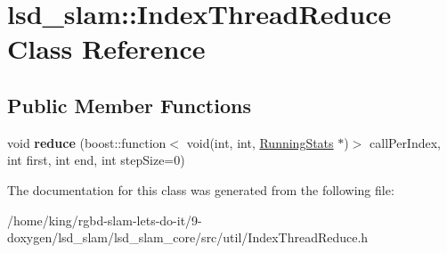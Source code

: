 \hypertarget{classlsd__slam_1_1_index_thread_reduce}{\section{lsd\-\_\-slam\-:\-:Index\-Thread\-Reduce Class Reference}
\label{classlsd__slam_1_1_index_thread_reduce}
}
\subsection*{Public Member Functions}
\begin{DoxyCompactItemize}
\item 
\hypertarget{classlsd__slam_1_1_index_thread_reduce_ab2476f8c783eed60926b7e161cf2e0fb}{void {\bfseries reduce} (boost\-::function$<$ void(int, int, \hyperlink{classlsd__slam_1_1_running_stats}{Running\-Stats} $\ast$)$>$ call\-Per\-Index, int first, int end, int step\-Size=0)}\label{classlsd__slam_1_1_index_thread_reduce_ab2476f8c783eed60926b7e161cf2e0fb}

\end{DoxyCompactItemize}


The documentation for this class was generated from the following file\-:\begin{DoxyCompactItemize}
\item 
/home/king/rgbd-\/slam-\/lets-\/do-\/it/9-\/doxygen/lsd\-\_\-slam/lsd\-\_\-slam\-\_\-core/src/util/Index\-Thread\-Reduce.\-h\end{DoxyCompactItemize}
